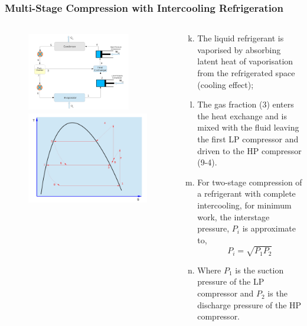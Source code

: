 \documentclass[10pt,compress,handout,ignorenonframetext]{beamer}
\begin{document}
\begin{frame}
 \frametitle{Multi-Stage Compression with Intercooling Refrigeration}
 \begin{columns}
  \begin{column}[c]{0.45\linewidth}
   \begin{figure}%
     \vbox{
      \includegraphics[width=4.5cm,height=3.5cm,clip]{./Pics/Overview_Refrig26}
      \vspace{-.1cm}
      \includegraphics[width=4.cm,height=4.cm,clip]{./Pics/Overview_Refrig27}}
   \end{figure}  
  \end{column}  
  \begin{column}[c]{0.55\linewidth}
   \begin{enumerate}[(a)]\setcounter{enumi}{10}
    \item <1-> The liquid refrigerant is vaporised  by absorbing latent heat of vaporisation from the refrigerated space (cooling effect);
    \item <2-> The gas fraction (3) enters the heat exchange and is mixed with the fluid leaving the first LP compressor and driven to the HP compressor (9-4).
    \item <3-> For two-stage compression of a refrigerant with complete intercooling, for minimum work, the interstage pressure, $P_{i}$ is approximate to,
      \begin{displaymath}
       P_{i}=\sqrt{P_{1}P_{2}}
      \end{displaymath}
    \item <4-> Where $P_{1}$ is the suction pressure of the LP compressor and $P_{2}$ is the discharge pressure of the HP compressor.
   \end{enumerate}
  \end{column}  
 \end{columns} 
\end{frame}
\end{document}
